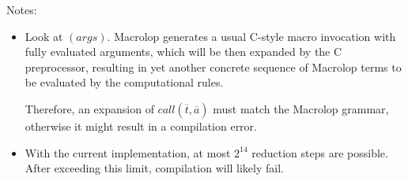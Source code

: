 \documentclass[12pt]{article}
\theoremstyle{break}
\begin{document}
Notes:

\begin{itemize}
    \item Look at $(args)$. Macrolop generates a usual C-style macro invocation with
    fully evaluated arguments, which will be then expanded by the C preprocessor, resulting
    in yet another concrete sequence of Macrolop terms to be evaluated by the computational
    rules. \par Therefore, an expansion of $call(\overline{t}, \overline{a})$
    must match the Macrolop grammar, otherwise it might result in a compilation error.
    \item With the current implementation, at most $2^{14}$ reduction steps are
    possible. After exceeding this limit, compilation will likely fail.
\end{itemize}

\printbibliography
\end{document}
